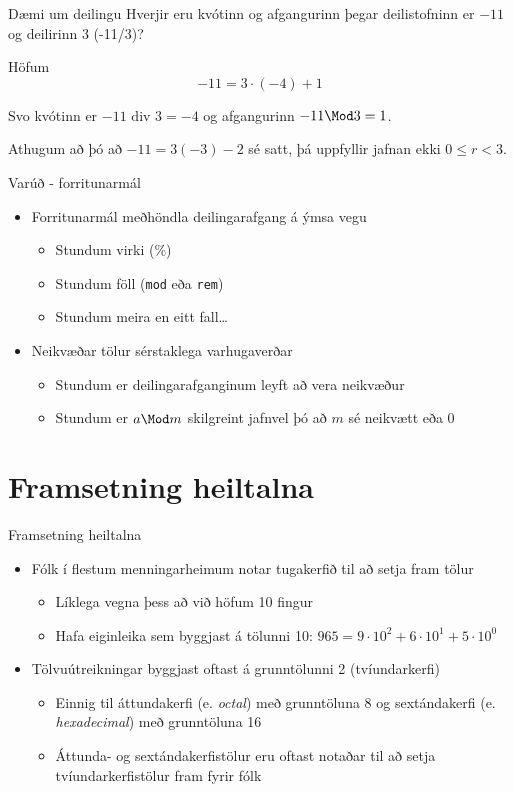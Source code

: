 \documentclass[handout]{beamer}
\begin{document}
\begin{frame}{Dæmi um deilingu}
Hverjir eru kvótinn og afgangurinn þegar deilistofninn er $-11$ og deilirinn $3$ (-11/3)? \pause

Höfum
\[
 -11 = 3 \cdot (-4) + 1
\]

Svo kvótinn er $-11 \text{ div } 3 = -4$ og afgangurinn $-11 \Mod 3 = 1$.

\vspace{0.5cm}
Athugum að þó að $-11 = 3(-3) - 2$ sé satt, þá uppfyllir jafnan ekki $0 \leq r < 3$.
\end{frame}

\begin{frame}{Varúð - forritunarmál}
\begin{itemize}
 \item Forritunarmál meðhöndla deilingarafgang á ýmsa vegu
 \begin{itemize}
  \item Stundum virki (\%)
  \item Stundum föll (\texttt{mod} eða \texttt{rem})
  \item Stundum meira en eitt fall\ldots
 \end{itemize}
 \item Neikvæðar tölur sérstaklega varhugaverðar
 \begin{itemize}
  \item Stundum er deilingarafganginum leyft að vera neikvæður
  \item Stundum er $a \Mod m$ skilgreint jafnvel þó að $m$ sé neikvætt eða 0
 \end{itemize}
\end{itemize}
\end{frame}

\section{Framsetning heiltalna}

\begin{frame}{Framsetning heiltalna}
\begin{itemize}
 \item Fólk í flestum menningarheimum notar tugakerfið til að setja fram tölur
 \begin{itemize}
  \item Líklega vegna þess að við höfum 10 fingur
  \item Hafa eiginleika sem byggjast á tölunni 10: $965 = 9\cdot10^2+6\cdot10^1+5\cdot10^0$
 \end{itemize}
 \item Tölvuútreikningar byggjast oftast á grunntölunni 2 (tvíundarkerfi)
 \begin{itemize}
  \item Einnig til áttundakerfi (e. \emph{octal}) með grunntöluna 8 og sextándakerfi (e. \emph{hexadecimal}) með grunntöluna 16
  \item Áttunda- og sextándakerfistölur eru oftast notaðar til að setja tvíundarkerfistölur fram fyrir fólk
 \end{itemize}
\end{itemize}
\end{frame}
\end{document}
